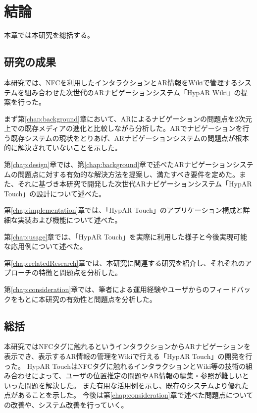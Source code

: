 \chapter{結論}
\label{chap:conclusion}

本章では本研究を総括する。

\newpage



\section{研究の成果}
本研究では、NFCを利用したインタラクションとAR情報をWikiで管理するシステムを組み合わせた次世代のARナビゲーションシステム「HypAR Wiki」の提案を行った。

まず第\ref{chap:background}章において、ARによるナビゲーションの問題点を2次元上での既存メディアの進化と比較しながら分析した。ARでナビゲーションを行う既存システムの現状をとりあげ、ARナビゲーションシステムの問題点が根本的に解決されていないことを示した。

第\ref{chap:design}章では、第\ref{chap:background}章で述べたARナビゲーションシステムの問題点に対する有効的な解決方法を提案し、満たすべき要件を定めた。また、それに基づき本研究で開発した次世代ARナビゲーションシステム「HypAR Touch」の設計について述べた。

第\ref{chap:implementation}章では、「HypAR Touch」のアプリケーション構成と詳細な実装および機能について述べた。

第\ref{chap:usage}章では、「HypAR Touch」を実際に利用した様子と今後実現可能な応用例について述べた。

第\ref{chap:relatedResearch}章では、本研究に関連する研究を紹介し、それぞれのアプローチの特徴と問題点を分析した。

第\ref{chap:consideration}章では、筆者による運用経験やユーザからのフィードバックをもとに本研究の有効性と問題点を分析した。

\section{総括}
本研究ではNFCタグに触れるというインタラクションからARナビゲーションを表示でき、表示するAR情報の管理をWikiで行える「HypAR Touch」の開発を行った。
HypAR TouchはNFCタグに触れるインタラクションとWiki等の技術の組み合わせによって、ユーザの位置推定の問題やAR情報の編集・参照が難しいといった問題を解決した。
また有用な活用例を示し、既存のシステムより優れた点があることを示した。
今後は第\ref{chap:consideration}章で述べた問題点についての改善や、システム改善を行っていく。